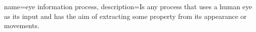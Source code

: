 \makenoidxglossaries

{
    name={eye information process},
    description={Is any process that uses a human eye as its input and has the aim of extracting some property from its appearance or movements.}
}

\usepackage{etoolbox}
\renewcommand\nomgroup[1]{%
  \item[\bfseries
  \ifstrequal{#1}{E}{Eye processing model sets}{%
  \ifstrequal{#1}{T}{Terminology}{%
  \ifstrequal{#1}{O}{Other Symbols}{}}}%
]}

\makenomenclature



